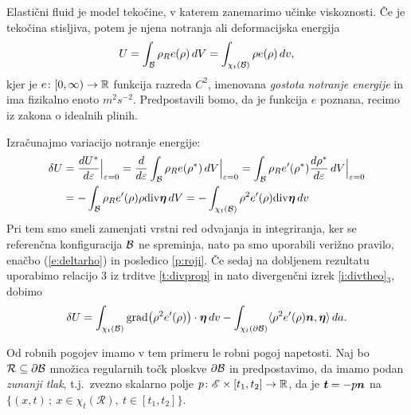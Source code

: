 Elastični fluid je model tekočine, v katerem zanemarimo učinke viskoznosti. Če je tekočina
stisljiva, potem je njena notranja ali deformacijska energija
\[ U=\int_{\mathcal B}\rho_R e(\rho)\,dV=\int_{\chi_t(\mathcal B)}\rho e(\rho)\,dv, \]
kjer je $e\colon[0,\infty)\to\mathbb R$ funkcija razreda $C^2$, imenovana
\emph{gostota notranje energije} in ima fizikalno enoto $m^2s^{-2}$.
Predpostavili bomo, da je funkcija $e$ poznana, recimo iz zakona o idealnih plinih.

Izračunajmo variacijo notranje energije:
\begin{align*} 
	\delta U &=\frac{dU^*}{d\varepsilon}\Big|_{\varepsilon=0}=\frac{d}{d\varepsilon}
	\int_{\mathcal B}\rho_R e(\rho^*)\,dV \Big|_{\varepsilon=0} =
	\int_{\mathcal B}\rho_R e'(\rho^*)\frac{d\rho^*}{d\varepsilon}\,dV \Big|_{\varepsilon=0} \\
	&= -\int_{\mathcal B}\rho_R e'(\rho)\rho\mathrm{div}\boldsymbol \eta\,dV
	= -\int_{\chi_t(\mathcal B)}\rho^2 e'(\rho)\mathrm{div}\boldsymbol \eta\,dv
\end{align*}
Pri tem smo smeli zamenjati vrstni red odvajanja in integriranja, ker se referenčna
konfiguracija $\mathcal B$ ne spreminja, nato pa smo uporabili verižno pravilo, enačbo
(\ref{e:deltarho}) in posledico \ref{p:roji}.
Če sedaj na dobljenem rezultatu uporabimo relacijo 3 iz trditve \ref{t:divprop} in
nato divergenčni izrek \ref{i:divtheo}$_3$, dobimo
\begin{equation} \label{e:varpot}
	\delta U=\int_{\chi_t(\mathcal B)}\mathrm{grad}\big(\rho^2 e'(\rho)\big)\cdot\boldsymbol \eta\,dv
	-\int_{\chi_t(\partial \mathcal B)}\langle\rho^2 e'(\rho)\boldsymbol n,\boldsymbol \eta\rangle\,da.
\end{equation}

Od robnih pogojev imamo v tem primeru le robni pogoj napetosti.
Naj bo $\mathcal{R}\subseteq\partial \mathcal B$ množica regularnih točk ploskve $\partial \mathcal B$ in
predpostavimo, da imamo podan \emph{zunanji tlak}, t.j.~zvezno skalarno polje
$p\colon \mathscr E\times[t_1,t_2]\to\mathbb R$, da je $\boldsymbol t=-p\boldsymbol n$ na
$\{(x,t)\,;\ x\in\chi_t(\mathcal{R}),\ t\in[t_1,t_2]\}$.

